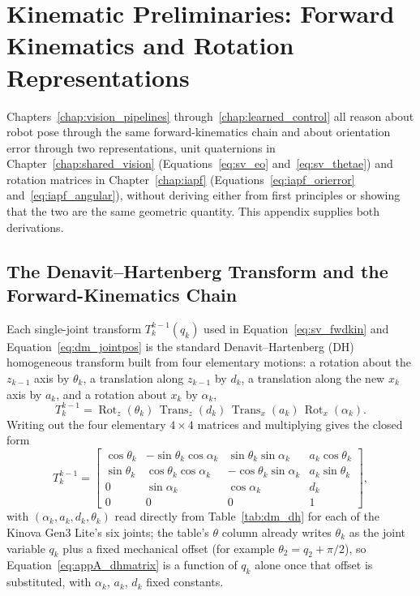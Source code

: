\chapter{Kinematic Preliminaries: Forward Kinematics and Rotation Representations}
\label{app:kinematics}

Chapters~\ref{chap:vision_pipelines} through~\ref{chap:learned_control} all reason about robot pose
through the same forward-kinematics chain and about orientation error through two representations,
unit quaternions in Chapter~\ref{chap:shared_vision} (Equations~\eqref{eq:sv_eo}
and~\eqref{eq:sv_thetae}) and rotation matrices in Chapter~\ref{chap:iapf}
(Equations~\eqref{eq:iapf_orierror} and~\eqref{eq:iapf_angular}), without deriving either from first
principles or showing that the two are the same geometric quantity. This appendix supplies both
derivations.

\section{The Denavit--Hartenberg Transform and the Forward-Kinematics Chain}\label{sec:appA_dh}

Each single-joint transform $T^{k-1}_{k}(q_k)$ used in Equation~\eqref{eq:sv_fwdkin} and
Equation~\eqref{eq:dm_jointpos} is the standard Denavit--Hartenberg (DH) homogeneous transform
built from four elementary motions: a rotation about the $z_{k-1}$ axis by $\theta_k$, a translation
along $z_{k-1}$ by $d_k$, a translation along the new $x_k$ axis by $a_k$, and a rotation about
$x_k$ by $\alpha_k$,
\begin{equation}
T^{k-1}_{k} = \operatorname{Rot}_z(\theta_k)\,\operatorname{Trans}_z(d_k)\,
\operatorname{Trans}_x(a_k)\,\operatorname{Rot}_x(\alpha_k).
\label{eq:appA_dhfactors}
\end{equation}
Writing out the four elementary $4\times4$ matrices and multiplying gives the closed form
\begin{equation}
T^{k-1}_{k} =
\begin{bmatrix}
\cos\theta_k & -\sin\theta_k\cos\alpha_k & \sin\theta_k\sin\alpha_k & a_k\cos\theta_k \\
\sin\theta_k & \cos\theta_k\cos\alpha_k & -\cos\theta_k\sin\alpha_k & a_k\sin\theta_k \\
0 & \sin\alpha_k & \cos\alpha_k & d_k \\
0 & 0 & 0 & 1
\end{bmatrix},
\label{eq:appA_dhmatrix}
\end{equation}
with $(\alpha_k, a_k, d_k, \theta_k)$ read directly from Table~\ref{tab:dm_dh} for each of the
Kinova Gen3 Lite's six joints; the table's $\theta$ column already writes $\theta_k$ as the joint
variable $q_k$ plus a fixed mechanical offset (for example $\theta_2 = q_2 + \pi/2$), so
Equation~\eqref{eq:appA_dhmatrix} is a function of $q_k$ alone once that offset is substituted, with
$\alpha_k$, $a_k$, $d_k$ fixed constants.

